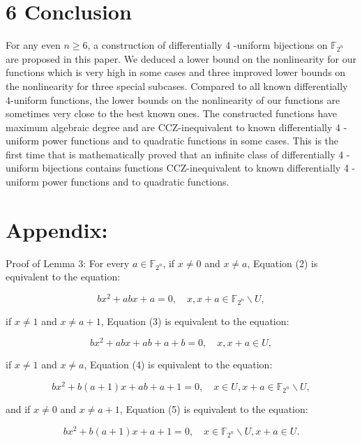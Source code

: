 \documentclass[10pt]{article}
\begin{document}
\section*{6 Conclusion}
For any even $n \geq 6$, a construction of differentially 4 -uniform bijections on $\mathbb{F}_{2^{n}}$ are proposed in this paper. We deduced a lower bound on the nonlinearity for our functions which is very high in some cases and three improved lower bounds on the nonlinearity for three special subcases. Compared to all known differentially 4-uniform functions, the lower bounds on the nonlinearity of our functions are sometimes very close to the best known ones. The constructed functions have maximum algebraic degree and are CCZ-inequivalent to known differentially 4 -uniform power functions and to quadratic functions in some cases. This is the first time that is mathematically proved that an infinite class of differentially 4 -uniform bijections contains functions CCZ-inequivalent to known differentially 4 -uniform power functions and to quadratic functions.

\section*{Appendix:}
Proof of Lemma 3: For every $a \in \mathbb{F}_{2^{n}}$, if $x \neq 0$ and $x \neq a$, Equation (2) is equivalent to the equation:


\begin{equation*}
b x^{2}+a b x+a=0, \quad x, x+a \in \mathbb{F}_{2^{n}} \backslash U, \tag{14}
\end{equation*}


if $x \neq 1$ and $x \neq a+1$, Equation (3) is equivalent to the equation:


\begin{equation*}
b x^{2}+a b x+a b+a+b=0, \quad x, x+a \in U, \tag{15}
\end{equation*}


if $x \neq 1$ and $x \neq a$, Equation (4) is equivalent to the equation:


\begin{equation*}
b x^{2}+b(a+1) x+a b+a+1=0, \quad x \in U, x+a \in \mathbb{F}_{2^{n}} \backslash U, \tag{16}
\end{equation*}


and if $x \neq 0$ and $x \neq a+1$, Equation (5) is equivalent to the equation:


\begin{equation*}
b x^{2}+b(a+1) x+a+1=0, \quad x \in \mathbb{F}_{2^{n}} \backslash U, x+a \in U . \tag{17}
\end{equation*}
\end{document}
